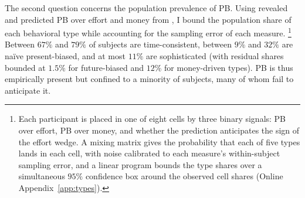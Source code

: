 \documentclass[11pt,a4paper]{article}
\theoremstyle{plain}
\theoremstyle{definition}
\begin{document}

The second question concerns the population prevalence of PB. Using revealed and predicted PB over effort and money from \citet{cerrone2026}, I bound the population share of each behavioral type while accounting for the sampling error of each measure.%
\footnote{Each participant is placed in one of eight cells by three binary signals: PB over effort, PB over money, and whether the prediction anticipates the sign of the effort wedge. A mixing matrix gives the probability that each of five types %
lands in each cell, with noise calibrated to each measure's within-subject sampling error, and a linear program bounds the type shares over a simultaneous $95\%$ confidence box around the observed cell shares (Online Appendix~\ref{app:types}).}
Between $67\%$ and $79\%$ of subjects are time-consistent, between $9\%$ and $32\%$ are naïve present-biased, and at most $11\%$ are sophisticated (with residual shares bounded at $1.5\%$ for future-biased and $12\%$ for money-driven types). 
PB is thus empirically present but confined to %
a minority of subjects, many of whom fail to anticipate it.
\end{document}
